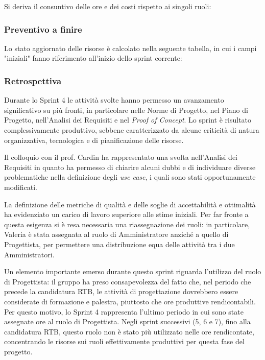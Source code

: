 \documentclass[10pt, letterpaper]{article}
\begin{document}
Si deriva il consuntivo delle ore e dei costi rispetto ai singoli ruoli:

\subsubsection{Preventivo a finire}
Lo stato aggiornato delle risorse è calcolato nella seguente tabella, in cui i campi "iniziali" fanno riferimento all'inizio dello sprint corrente:


\subsubsection{Retrospettiva}
Durante lo Sprint 4 le attività svolte hanno permesso un avanzamento significativo su più fronti,
in particolare nelle Norme di Progetto, nel Piano di Progetto, nell'Analisi dei Requisiti e nel \textit{Proof of Concept}.
Lo sprint è risultato complessivamente produttivo, sebbene caratterizzato da alcune criticità di
natura organizzativa, tecnologica e di pianificazione delle risorse.

Il colloquio con il prof. Cardin ha rappresentato una svolta nell'Analisi dei Requisiti in quanto ha
permesso di chiarire alcuni dubbi e di individuare diverse problematiche nella definizione degli \textit{use case}, i quali
sono stati opportunamente modificati.

La definizione delle metriche di qualità e delle soglie di accettabilità e ottimalità
ha evidenziato un carico di lavoro superiore alle stime iniziali. Per far fronte
a questa esigenza si è resa necessaria una riassegnazione dei ruoli:
in particolare, Valeria è stata assegnata al ruolo di Amministratore anziché a
quello di Progettista, per permettere una distribuzione equa delle attività tra
i due Amministratori.

Un elemento importante emerso durante questo sprint riguarda l'utilizzo del ruolo di Progettista:
il gruppo ha preso consapevolezza del fatto che, nel periodo che precede la candidatura RTB,
le attività di progettazione dovrebbero essere considerate di formazione e palestra,
piuttosto che ore produttive rendicontabili. Per questo motivo, lo Sprint 4 rappresenta
l'ultimo periodo in cui sono state assegnate ore al ruolo di Progettista. Negli sprint successivi
(5, 6 e 7), fino alla candidatura RTB, questo ruolo non è stato più utilizzato nelle ore
rendicontate, concentrando le risorse sui ruoli effettivamente produttivi per questa fase
del progetto.
\end{document}

